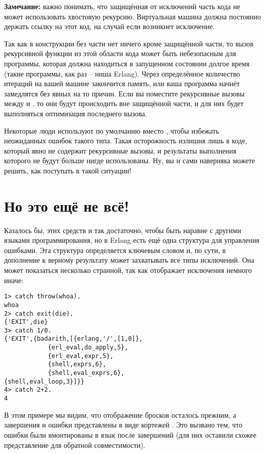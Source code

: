 \colorbox{lgray}
{
\begin{minipage}{1.0\linewidth}
    \textbf{Замечание:} важно понимать, что защищённая от исключений часть кода не может использовать хвостовую рекурсию.
    Виртуальная машина должна постоянно держать ссылку на этот код, на случай если возникнет исключение.

    Так как в конструкции  без части  нет ничего кроме защищённой части, то вызов рекурсивной функции из этой области кода может быть небезопасным для программы, которая должна находиться в запущенном состоянии долгое время (такие программы, как раз \--- ниша Erlang).
    Через определённое количество итераций на вашей машине закончится память, или ваша программа начнёт замедлятся без явных на то причин.
    Если вы поместите рекурсивные вызовы между  и , то они будут происходить вне защищённой части, и для них будет выполняться оптимизация последнего вызова.

    Некоторые люди  используют по умолчанию  вместо , чтобы избежать неожиданных ошибок такого типа.
    Такая осторожность излишня лишь в коде, который явно не содержит рекурсивные вызовы, и результаты выполнения которого не будут больше нигде использованы. Ну, вы и сами наверняка можете решить, как поступать в такой ситуации!
\end{minipage}
}
\section{Но это ещё не всё!}
\label{wait-theres-more}
Казалось бы, этих средств и так достаточно, чтобы быть наравне с другими языками программирования, но в Erlang есть ещё одна структура для управления ошибками.
Эта структура определяется ключевым словом  и, по сути, в дополнение к верному результату может захватывать все типы исключений.
Она может показаться несколько странной, так как отображает исключения немного иначе:
\begin{lstlisting}[style=erlang]
1> catch throw(whoa).
whoa
2> catch exit(die).
{'EXIT',die}
3> catch 1/0.
{'EXIT',{badarith,[{erlang,'/',[1,0]},
            {erl_eval,do_apply,5},
            {erl_eval,expr,5},
            {shell,exprs,6},
            {shell,eval_exprs,6},
{shell,eval_loop,3}]}}
4> catch 2+2.
4
\end{lstlisting}

В этом примере мы видим, что отображение бросков осталось прежним, а завершения и ошибки представлены в виде кортежей .
Это вызвано тем, что ошибки были вмонтированы в язык после завершений (для них оставили схожее представление для обратной совместимости).

